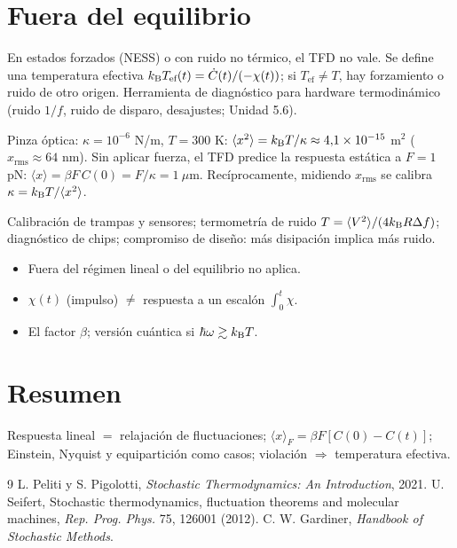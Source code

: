 \documentclass[11pt,a4paper]{article}
\begin{document}
\section{Fuera del equilibrio}
En estados forzados (NESS) o con ruido no térmico, el TFD no vale. Se define una temperatura efectiva
$k_{\mathrm B} T_{\text{ef}}(t)=\dot C(t)/(-\chi(t))$; si $T_{\text{ef}}\neq T$, hay forzamiento o ruido de otro origen. Herramienta de
diagnóstico para hardware termodinámico (ruido $1/f$, ruido de disparo, desajustes; Unidad 5.6).

\begin{ejemplo}
Pinza óptica: $\kappa=10^{-6}$ N/m, $T=300$ K: $\langle x^2\rangle=k_{\mathrm B} T/\kappa\approx4{,}1\times10^{-15}$ m$^2$ ($x_{\text{rms}}\approx64$ nm).
Sin aplicar fuerza, el TFD predice la respuesta estática a $F=1$ pN: $\langle x\rangle=\beta F\,C(0)=F/\kappa=1\ \mu$m.
Recíprocamente, midiendo $x_{\text{rms}}$ se calibra $\kappa=k_{\mathrm B} T/\langle x^2\rangle$.
\end{ejemplo}

\begin{aplicacion}
Calibración de trampas y sensores; termometría de ruido $T=\langle V^2\rangle/(4k_{\mathrm B} R\Delta f)$; diagnóstico de chips; compromiso
de diseño: más disipación implica más ruido.
\end{aplicacion}

\begin{error}
\begin{itemize}[nosep]
\item Fuera del régimen lineal o del equilibrio no aplica.
\item $\chi(t)$ (impulso) $\neq$ respuesta a un escalón $\int_0^t\chi$.
\item El factor $\beta$; versión cuántica si $\hbar\omega\gtrsim k_{\mathrm B} T$.
\end{itemize}
\end{error}

\section{Resumen}
Respuesta lineal $=$ relajación de fluctuaciones; $\langle x\rangle_F=\beta F[C(0)-C(t)]$; Einstein, Nyquist y equipartición
como casos; violación $\Rightarrow$ temperatura efectiva.

\begin{thebibliography}{9}\small
{} L. Peliti y S. Pigolotti, \emph{Stochastic Thermodynamics: An Introduction}, 2021.
 U. Seifert, Stochastic thermodynamics, fluctuation theorems and molecular machines, \emph{Rep. Prog. Phys.} 75, 126001 (2012).
 C. W. Gardiner, \emph{Handbook of Stochastic Methods}.
\end{thebibliography}
\end{document}
